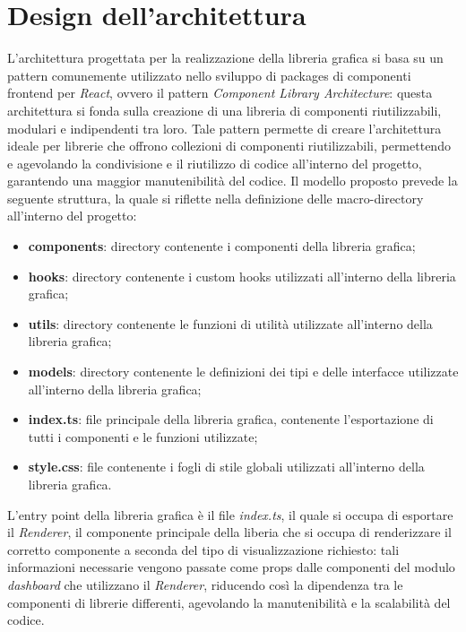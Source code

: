 \section{Design dell'architettura}
L'architettura progettata per la realizzazione della libreria grafica si basa su un pattern comunemente utilizzato nello sviluppo di packages
di componenti frontend per \textit{React}, ovvero il pattern \textit{Component Library Architecture}: questa architettura si fonda sulla creazione di una libreria di
componenti riutilizzabili, modulari e indipendenti tra loro. \newline
Tale pattern permette di creare l'architettura ideale per librerie che offrono collezioni di componenti riutilizzabili, permettendo e agevolando
la condivisione e il riutilizzo di codice all'interno del progetto, garantendo una maggior manutenibilità del codice. \newline
Il modello proposto prevede la seguente struttura, la quale si riflette nella definizione delle macro-directory all'interno del progetto:
\begin{itemize}
      \item \textbf{components}: directory contenente i componenti della libreria grafica;
      \item \textbf{hooks}: directory contenente i custom hooks utilizzati all'interno della libreria grafica;
      \item \textbf{utils}: directory contenente le funzioni di utilità utilizzate all'interno della libreria grafica;
      \item \textbf{models}: directory contenente le definizioni dei tipi e delle interfacce utilizzate all'interno della libreria grafica;
      \item \textbf{index.ts}: file principale della libreria grafica, contenente l'esportazione di tutti i componenti e le funzioni utilizzate;
      \item \textbf{style.css}: file contenente i fogli di stile globali utilizzati all'interno della libreria grafica.
\end{itemize}
L'entry point della libreria grafica è il file \textit{index.ts}, il quale si occupa di esportare il \textit{Renderer}, il componente principale
della liberia che si occupa di renderizzare il corretto componente a seconda del tipo di visualizzazione richiesto: tali informazioni necessarie
vengono passate come props dalle componenti del modulo \textit{dashboard} che utilizzano il \textit{Renderer}, riducendo così la dipendenza tra le
componenti di librerie differenti, agevolando la manutenibilità e la scalabilità del codice.


